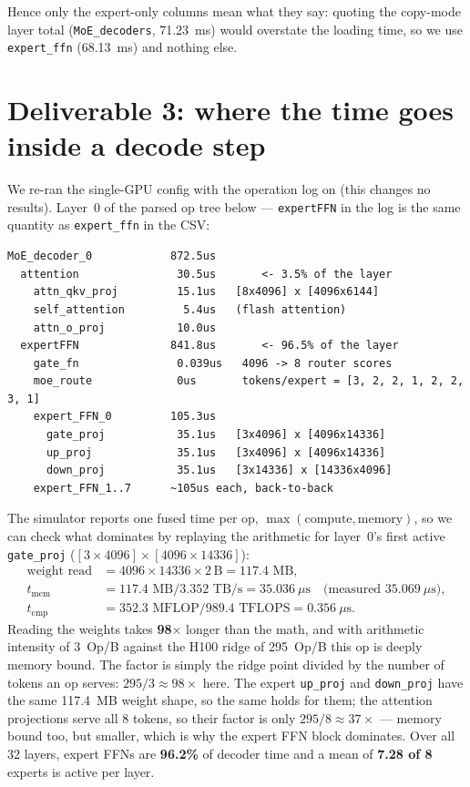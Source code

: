\documentclass[11pt,a4paper]{report}
\begin{document}
Hence only the expert-only columns mean what they say: quoting the copy-mode layer total (\texttt{MoE\_decoders}, 71.23~ms) would overstate the loading time, so we use \texttt{expert\_ffn} (68.13~ms) and nothing else.

\section{Deliverable 3: where the time goes inside a decode step}

We re-ran the single-GPU config with the operation log on (this changes no results). Layer~0 of the parsed op tree below --- \texttt{expertFFN} in the log is the same quantity as \texttt{expert\_ffn} in the CSV:

\begin{lstlisting}
MoE_decoder_0            872.5us
  attention               30.5us       <- 3.5% of the layer
    attn_qkv_proj         15.1us   [8x4096] x [4096x6144]
    self_attention         5.4us   (flash attention)
    attn_o_proj           10.0us
  expertFFN              841.8us       <- 96.5% of the layer
    gate_fn               0.039us   4096 -> 8 router scores
    moe_route             0us       tokens/expert = [3, 2, 2, 1, 2, 2, 3, 1]
    expert_FFN_0         105.3us
      gate_proj           35.1us   [3x4096] x [4096x14336]
      up_proj             35.1us   [3x4096] x [4096x14336]
      down_proj           35.1us   [3x14336] x [14336x4096]
    expert_FFN_1..7      ~105us each, back-to-back
\end{lstlisting}

The simulator reports one fused time per op, $\max(\text{compute},\text{memory})$, so we can check what dominates by replaying the arithmetic for layer~0's first active \texttt{gate\_proj} ($[3 \times 4096] \times [4096 \times 14336]$):
\begin{align}
\text{weight read} &= 4096 \times 14336 \times 2\,\text{B} = 117.4\text{ MB},\nonumber\\
t_{\text{mem}} &= 117.4\text{ MB} / 3.352\text{ TB/s} = 35.036\ \mu\text{s}\quad \text{(measured } 35.069\ \mu\text{s)},\nonumber\\
t_{\text{cmp}} &= 352.3\text{ MFLOP} / 989.4\text{ TFLOPS} = 0.356\ \mu\text{s}.
\end{align}
Reading the weights takes \textbf{98$\times$} longer than the math, and with arithmetic intensity of 3~Op/B against the H100 ridge of 295~Op/B this op is deeply memory bound. The factor is simply the ridge point divided by the number of tokens an op serves: $295/3 \approx 98\times$ here. The expert \texttt{up\_proj} and \texttt{down\_proj} have the same 117.4~MB weight shape, so the same holds for them; the attention projections serve all 8 tokens, so their factor is only $295/8 \approx 37\times$ --- memory bound too, but smaller, which is why the expert FFN block dominates. Over all 32 layers, expert FFNs are \textbf{96.2\%} of decoder time and a mean of \textbf{7.28 of 8} experts is active per layer.
\end{document}

